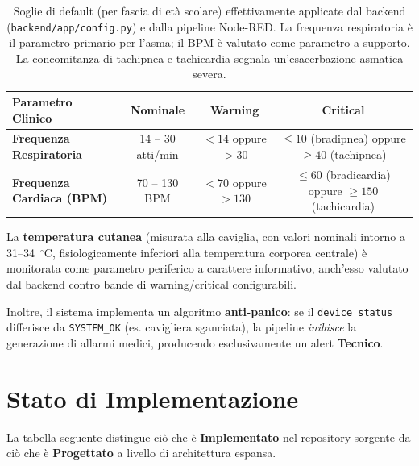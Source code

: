 \documentclass[11pt,a4paper]{article}
\newcommand{\IMPL}{\textcolor{okgreen}{\textbf{Implementato}}}
\newcommand{\PLAN}{\textcolor{planorange}{\textbf{Progettato}}}
\begin{document}
\begin{table}[h]
\centering
\small
\begin{tabularx}{\textwidth}{@{}Yccc@{}}
\toprule
\textbf{Parametro Clinico} & \textbf{Nominale} & \textbf{Warning} & \textbf{Critical} \\
\midrule
\textbf{Frequenza Respiratoria} & 14 -- 30 atti/min & $<14$ oppure $>30$ & $\leq 10$ (bradipnea) oppure $\geq 40$ (tachipnea) \\
\textbf{Frequenza Cardiaca (BPM)} & 70 -- 130 BPM & $<70$ oppure $>130$ & $\leq 60$ (bradicardia) oppure $\geq 150$ (tachicardia) \\
\bottomrule
\end{tabularx}
\caption*{\footnotesize Soglie di default (per fascia di età scolare) effettivamente applicate dal backend (\texttt{backend/app/config.py}) e dalla pipeline Node-RED. La frequenza respiratoria è il parametro primario per l'asma; il BPM è valutato come parametro a supporto. La concomitanza di tachipnea e tachicardia segnala un'esacerbazione asmatica severa.}
\end{table}

La \textbf{temperatura cutanea} (misurata alla caviglia, con valori nominali intorno a 31--34~$^\circ$C, fisiologicamente inferiori alla temperatura corporea centrale) è monitorata come parametro periferico a carattere informativo, anch'esso valutato dal backend contro bande di warning/critical configurabili.

Inoltre, il sistema implementa un algoritmo \textbf{anti-panico}: se il \texttt{device\_status} differisce da \texttt{SYSTEM\_OK} (es. cavigliera sganciata), la pipeline \emph{inibisce} la generazione di allarmi medici, producendo esclusivamente un alert \textbf{Tecnico}.

\newpage
\section{Stato di Implementazione}\label{sec:stato}

La tabella seguente distingue ciò che è \IMPL{} nel repository sorgente da ciò che è \PLAN{} a livello di architettura espansa.
\end{document}
